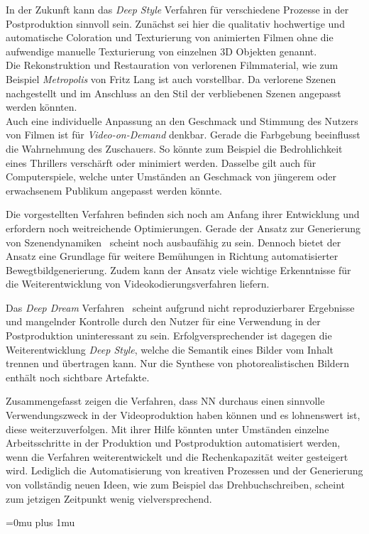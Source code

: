 \documentclass[times, 11pt,twocolumn]{article}
\begin{document}
In der Zukunft kann das \textit{Deep Style} Verfahren für verschiedene Prozesse in der Postproduktion sinnvoll sein. Zunächst sei hier die qualitativ hochwertige und automatische Coloration und Texturierung von animierten Filmen ohne die aufwendige manuelle Texturierung von einzelnen 3D Objekten genannt. \\
Die Rekonstruktion und Restauration von verlorenen Filmmaterial, wie zum Beispiel \textit{Metropolis} von Fritz Lang ist auch vorstellbar. Da verlorene Szenen nachgestellt und im Anschluss an den Stil der verbliebenen Szenen angepasst werden könnten.\\
Auch eine individuelle Anpassung an den Geschmack und Stimmung des Nutzers von Filmen ist für \textit{Video-on-Demand} denkbar. Gerade die Farbgebung beeinflusst die Wahrnehmung des Zuschauers. So könnte zum Beispiel die Bedrohlichkeit eines Thrillers verschärft oder minimiert werden. Dasselbe gilt auch für Computerspiele, welche unter Umständen an Geschmack von jüngerem oder erwachsenem Publikum angepasst werden könnte.

 \label{Fazit}
Die vorgestellten Verfahren befinden sich noch am Anfang ihrer Entwicklung und erfordern noch weitreichende Optimierungen. Gerade der Ansatz zur Generierung von Szenendynamiken~\cite{VondrickPT16} scheint noch ausbaufähig zu sein. Dennoch bietet der Ansatz eine Grundlage für weitere Bemühungen in Richtung automatisierter Bewegtbildgenerierung. Zudem kann der Ansatz viele wichtige Erkenntnisse für die Weiterentwicklung von Videokodierungsverfahren liefern.

Das \textit{Deep Dream} Verfahren~\cite{DeepDream} scheint aufgrund nicht reproduzierbarer Ergebnisse und mangelnder Kontrolle durch den Nutzer für eine Verwendung in der Postproduktion uninteressant zu sein. Erfolgversprechender ist dagegen die Weiterentwicklung \textit{Deep Style}, welche die Semantik eines Bilder vom Inhalt trennen und übertragen kann. Nur die Synthese von photorealistischen Bildern enthält noch sichtbare Artefakte.

Zusammengefasst zeigen die Verfahren, dass NN durchaus einen sinnvolle Verwendungszweck in der Videoproduktion haben können und es lohnenswert ist, diese weiterzuverfolgen. Mit ihrer Hilfe könnten unter Umständen einzelne Arbeitsschritte in der Produktion und Postproduktion automatisiert werden, wenn die Verfahren weiterentwickelt und die Rechenkapazität weiter gesteigert wird. Lediglich die Automatisierung von kreativen Prozessen und der Generierung von vollständig neuen Ideen, wie zum Beispiel das Drehbuchschreiben, scheint zum jetzigen Zeitpunkt wenig vielversprechend.


\newpage
\Urlmuskip=0mu plus 1mu\relax %
 

\end{document}
